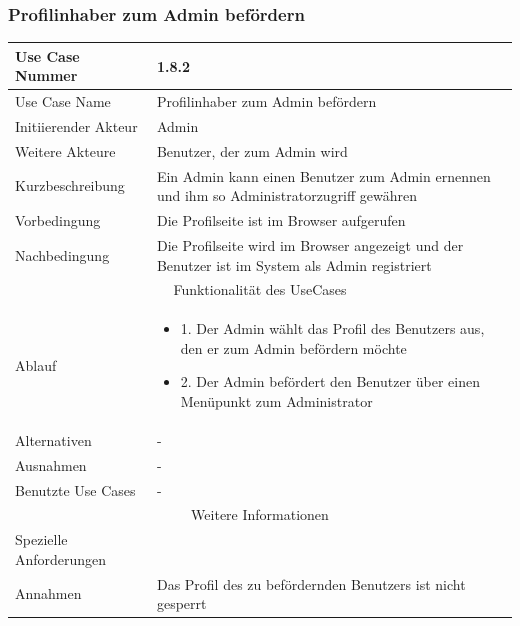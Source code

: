 \documentclass[10pt,a4paper]{article}
\begin{document}
			\subsubsection{Profilinhaber zum Admin bef\"ordern}
		\begin{tabular}{|l|p{.5\linewidth}|}
		\hline Use Case Nummer & 1.8.2 \\ 
		\hline Use Case Name & Profilinhaber zum Admin bef\"ordern \\ 
		\hline Initiierender Akteur & Admin \\
		\hline Weitere Akteure & Benutzer, der zum Admin wird \\
		\hline Kurzbeschreibung & Ein Admin kann einen Benutzer zum Admin ernennen und ihm so Administratorzugriff gew\"ahren \\
		\hline Vorbedingung & Die Profilseite ist im Browser aufgerufen \\
		\hline Nachbedingung & Die Profilseite wird im Browser angezeigt und der Benutzer ist im System als Admin registriert \\
		\hline \multicolumn{2}{|c|}{Funktionalität des UseCases}\\
		\hline  Ablauf & \begin{itemize}
					\item 1. Der Admin w\"ahlt das Profil des Benutzers aus, den er zum Admin bef\"ordern m\"ochte
					\item 2. Der Admin bef\"ordert den Benutzer \"uber einen Men\"upunkt zum Administrator
				\end{itemize}\\
		\hline Alternativen & - \\
		\hline Ausnahmen & - \\
		\hline Benutzte Use Cases & - \\
		\hline \multicolumn{2}{|c|}{Weitere Informationen} \\
		\hline Spezielle Anforderungen &  \\
		\hline Annahmen & Das Profil des zu bef\"ordernden Benutzers ist nicht gesperrt \\
		\hline
		\end{tabular}
		
\end{document}
